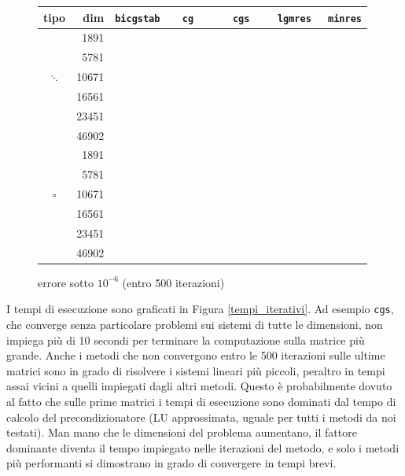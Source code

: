 \documentclass[11pt,a4paper]{scrartcl}
\newcommand{\yep}{\ding{51}}%
\newcommand{\nope}{\ding{55}}%
\begin{document}
\begin{figure}[!ht]
\centering
\begin{tabular}{cr|ccccc}
\toprule
tipo & dim & \verb|bicgstab| & \verb|  cg   | & \verb|  cgs  | & \verb| lgmres| & \verb| minres| \\
\midrule
\multirow{5}{*}{$\ddots$} & {1891} & \yep & \yep & \yep & \yep & \yep \\
& {5781} & \yep & \yep & \yep & \yep & \yep \\
& {10671} & \yep & \yep & \yep & \yep & \yep \\
& {16561} & \yep & \yep  & \yep & \yep & \nope \\
& {23451} & \yep & \nope & \yep & \yep & \nope \\
& {46902} & \nope & \nope & \yep & \yep & \nope \\ 
\midrule
\multirow{5}{*}{$\square$} & {1891} & \yep & \yep & \yep & \yep & \yep \\
& {5781} & \yep & \yep & \yep & \yep & \yep \\
& {10671} & \yep & \yep & \yep & \yep & \yep \\
& {16561} & \yep & \yep  & \yep & \yep & \nope \\
& {23451} & \yep & \nope & \yep & \yep & \nope \\
& {46902} & \yep & \nope & \yep & \yep & \nope \\ 
\bottomrule
\end{tabular}
\caption{errore sotto $10^{-6}$ (entro 500 iterazioni)}
\label{tabella2}
\end{figure}

I tempi di esecuzione sono graficati in Figura \ref{tempi_iterativi}. Ad esempio \texttt{cgs}, che converge senza particolare problemi sui sistemi di tutte le dimensioni, non impiega più di 10 secondi per terminare la computazione sulla matrice più grande. Anche i metodi che non convergono entro le 500 iterazioni sulle ultime matrici sono in grado di risolvere i sistemi lineari più piccoli, peraltro in tempi assai vicini a quelli impiegati dagli altri metodi. Questo è probabilmente dovuto al fatto che sulle prime matrici i tempi di esecuzione sono dominati dal tempo di calcolo del precondizionatore (LU approssimata, uguale per tutti i metodi da noi testati). Man mano che le dimensioni del problema aumentano, il fattore dominante diventa il tempo impiegato nelle iterazioni del metodo, e solo i metodi più performanti si dimostrano in grado di convergere in tempi brevi. 
\end{document}
